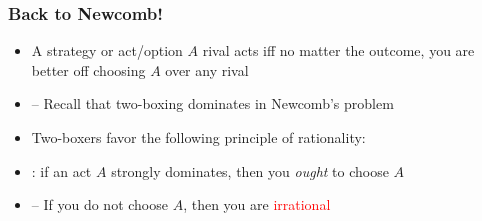 

\begin{frame}
\frametitle{Back to Newcomb!}

\begin{itemize}[<+->]

\item A strategy or act/option $A$  rival acts iff no matter the outcome, you are better off choosing $A$ over any rival 

\item[] -- Recall that two-boxing dominates in Newcomb's problem

\item Two-boxers favor the following principle of rationality:

\item {}: if an act $A$ strongly dominates, then you \textit{ought} to choose $A$

\item[] -- If you do not choose $A$, then you are \textcolor{red}{irrational} 






\end{itemize}
\end{frame}

